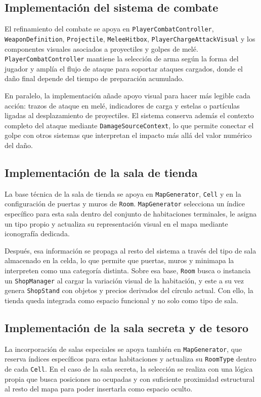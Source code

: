 \subsection{Implementación del sistema de combate}
El refinamiento del combate se apoya en \texttt{PlayerCombatController},
\texttt{WeaponDefinition}, \texttt{Projectile}, \texttt{MeleeHitbox},
\texttt{PlayerChargeAttackVisual} y los componentes visuales asociados a proyectiles y
golpes de melé. \texttt{PlayerCombatController} mantiene la selección de arma según la forma
del jugador y amplía el flujo de ataque para soportar ataques cargados, donde el daño final
depende del tiempo de preparación acumulado.

En paralelo, la implementación añade apoyo visual para hacer más legible cada acción:
trazos de ataque en melé, indicadores de carga y estelas o partículas ligadas al
desplazamiento de proyectiles. El sistema conserva además el contexto completo del ataque
mediante \texttt{DamageSourceContext}, lo que permite conectar el golpe con otros sistemas
que interpretan el impacto más allá del valor numérico del daño.

\subsection{Implementación de la sala de tienda}
La base técnica de la sala de tienda se apoya en \texttt{MapGenerator}, \texttt{Cell} y en
la configuración de puertas y muros de \texttt{Room}. \texttt{MapGenerator} selecciona un
índice específico para esta sala dentro del conjunto de habitaciones terminales, le asigna
un tipo propio y actualiza su representación visual en el mapa mediante iconografía
dedicada.

Después, esa información se propaga al resto del sistema a través del tipo de sala
almacenado en la celda, lo que permite que puertas, muros y minimapa la interpreten como una
categoría distinta. Sobre esa base, \texttt{Room} busca o instancia un \texttt{ShopManager}
al cargar la variación visual de la habitación, y este a su vez genera \texttt{ShopStand}
con objetos y precios derivados del círculo actual. Con ello, la tienda queda integrada como
espacio funcional y no solo como tipo de sala.

\subsection{Implementación de la sala secreta y de tesoro}
La incorporación de salas especiales se apoya también en \texttt{MapGenerator}, que reserva
índices específicos para estas habitaciones y actualiza su \texttt{RoomType} dentro de cada
\texttt{Cell}. En el caso de la sala secreta, la selección se realiza con una lógica propia
que busca posiciones no ocupadas y con suficiente proximidad estructural al resto del mapa
para poder insertarla como espacio oculto.

